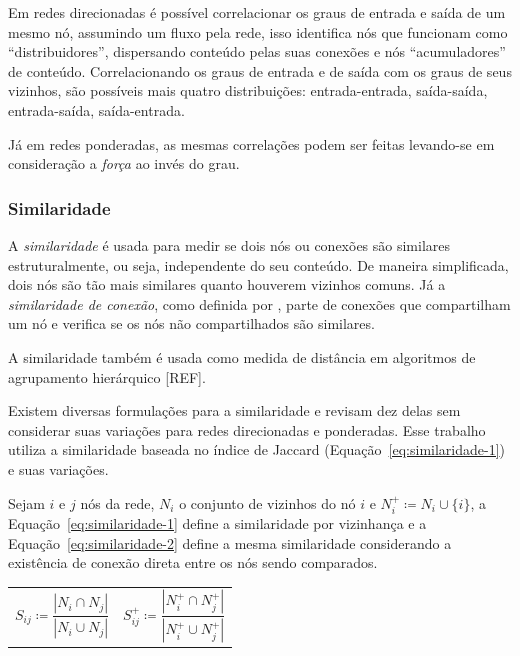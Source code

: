 \documentclass[12pt,a4paper]{article}
\theoremstyle{hypo}
\newcommand{\defn}{\coloneqq} %
\begin{document}
Em redes direcionadas é possível correlacionar os graus de entrada e saída de um mesmo nó, assumindo um fluxo pela rede, isso identifica nós que funcionam como \enquote{distribuidores}, dispersando conteúdo pelas suas conexões e nós \enquote{acumuladores} de conteúdo. Correlacionando os graus de entrada e de saída com  os graus de seus vizinhos, são possíveis mais quatro distribuições: entrada-entrada, saída-saída, entrada-saída, saída-entrada.

Já em redes ponderadas, as mesmas correlações podem ser feitas levando-se em consideração a \textit{força} ao invés do grau.

\subsubsection{Similaridade}

A \textit{similaridade} é usada para medir se dois nós ou conexões são similares estruturalmente, ou seja, independente do seu conteúdo. De maneira simplificada, dois nós são tão mais similares quanto houverem vizinhos comuns. Já a \textit{similaridade de conexão}, como definida por , parte de conexões que compartilham um nó e verifica se os nós não compartilhados são similares.

A similaridade também é usada como medida de distância em algoritmos de agrupamento hierárquico [REF].

Existem diversas formulações para a similaridade e  revisam dez delas sem considerar suas variações para redes direcionadas e ponderadas. Esse trabalho utiliza a similaridade baseada no índice de Jaccard (Equação~\ref{eq:similaridade-1}) e suas variações.

Sejam $i$ e $j$ nós da rede, $N_i$ o conjunto de vizinhos do nó $i$ e $N_i^+ \defn N_i \cup \{i\}$, a Equação~\ref{eq:similaridade-1} define a similaridade por vizinhança e a Equação~\ref{eq:similaridade-2} define a mesma similaridade considerando a existência de conexão direta entre os nós sendo comparados.

\noindent
\begin{tabularx}{\linewidth}{@{}XX@{}}
    \begin{equation} \label{eq:similaridade-1}
        S_{ij} \defn \frac{|N_i \cap N_j|}{|N_i \cup N_j|} 
    \end{equation} &
    \begin{equation} \label{eq:similaridade-2}
        S_{ij}^+ \defn \frac{|N_i^+ \cap N_j^+|}{|N_i^+ \cup N_j^+|} 
    \end{equation}
\end{tabularx}
\end{document}
